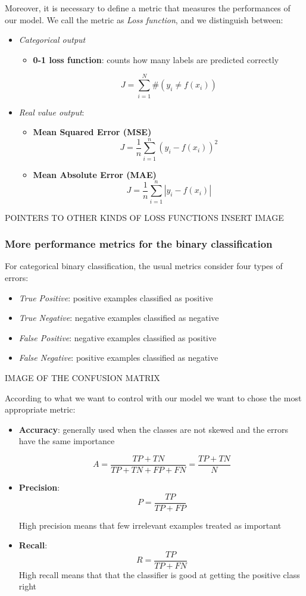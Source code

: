 Moreover, it is necessary to define a metric that measures the performances of our model. We call the metric as \emph{Loss function}, and we distinguish between:
\begin{itemize}
\item \emph{Categorical output}
\begin{itemize}
\item \textbf{0-1 loss function}: counts how many labels are predicted correctly

$$J = \sum_{i=1}^{N} \#(y_i \neq f(x_i))$$
\end{itemize}
\item \emph{Real value output}: 

\begin{itemize}
\item \textbf{Mean Squared Error (MSE)}
$$J = \frac{1}{n}\sum_{i=1}^{n} (y_i -  f(x_i))^2$$
\item \textbf{Mean Absolute Error (MAE)}
$$J = \frac{1}{n}\sum_{i=1}^{n} |y_i -  f(x_i)|$$
\end{itemize}

\end{itemize}

POINTERS TO OTHER KINDS OF LOSS FUNCTIONS
INSERT IMAGE

\subsubsection*{More performance metrics for the binary classification}

For categorical binary classification, the usual metrics consider four types of errors:

\begin{itemize}
\item \emph{True Positive}: positive examples classified as positive
\item \emph{True Negative}: negative examples classified as negative
\item \emph{False Positive}: negative examples classified as positive
\item \emph{False Negative}: positive examples classified as negative
\end{itemize}

IMAGE OF THE CONFUSION MATRIX

According to what we want to control with our model we want to chose the most appropriate metric:
\begin{itemize}
\item \textbf{Accuracy}: generally used when the classes are not skewed
and the errors have the same importance

$$A = \frac{TP+TN}{TP+TN+FP+FN} =  \frac{TP+TN}{N}$$

\item \textbf{Precision}: 
$$P = \frac{TP}{TP+FP}$$

High precision means that few irrelevant examples treated as important 
\item \textbf{Recall}: 
$$	R = \frac{TP}{TP+FN}$$
High recall means that that the classifier is good at getting the positive class right
\end{itemize}

